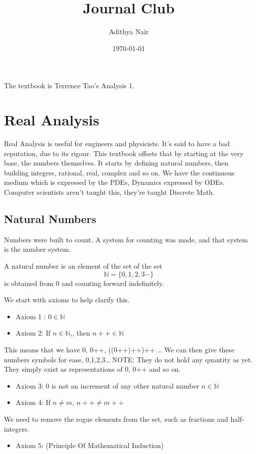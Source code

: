 \documentclass[11pt]{report}
\author{Adithya Nair}
\date{\today}
\title{Journal Club}
\begin{document}
\maketitle
\tableofcontents

The textbook is Terrence Tao's Analysis 1.
\part{Real Analysis}
\label{sec:orgbd35302}
Real Analysis is useful for engineers and physicists. It's said to have a bad reputation, due to its rigour. This textbook offsets that by starting at the very base, the numbers themselves. It starts by defining natural numbers, then building integers, rational, real, complex and so on.
We have the continuous medium which is expressed by the PDEs, Dynamics expressed by ODEs. Computer scientists aren't taught this,  they're taught Discrete Math.
\chapter{Natural Numbers}
\label{sec:org0ec79fd}
Numbers were built to count. A system for counting was made, and that system is the number system.

\begin{definition}
A natural number is an element of the set  of the set
\[
\mathbb{N} = \{0,1,2,3\cdots \}
\]
is obtained from 0 and counting forward indefinitely.
\end{definition}
We start with axioms to help clarify this.
\begin{itemize}
\item Axiom 1 : \(0 \in \mathbb{N}\)
\item Axiom 2: If \(n \in \mathbb{N}\),, then \(n++ \in \mathbb{N}\)
\end{itemize}
This means that we have 0, 0++, ((0++)++)++ \ldots{}
 We can then give these numbers  symbols for ease, 0,1,2,3\ldots{} NOTE: They do not hold any quantity as yet. They simply exist as representations of 0, 0++ and so on.
\begin{itemize}
\item Axiom 3: 0 is not an increment of any other natural number \(n \in \mathbb{N}\)
\item Axiom 4: If \(n \neq m\), \(n++ \neq m++\)
\end{itemize}
We need to remove the rogue elements from the set, such as fractions and half-integers.
\begin{itemize}
\item Axiom 5: (Principle Of Mathematical Induction)
\end{itemize}
\end{document}
